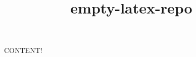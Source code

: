 \documentclass[11pt]{article}
\title{empty-latex-repo}
\begin{document}
\maketitle

CONTENT!

\citet{ebert2017computationally}


\end{document}
